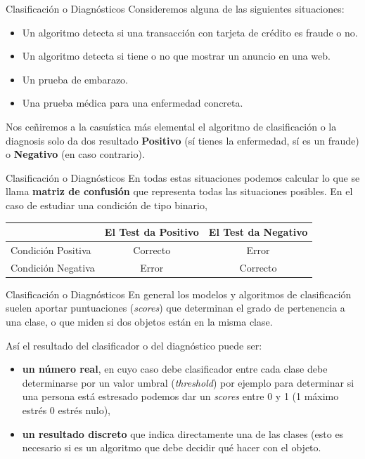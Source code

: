\documentclass[
  ignorenonframetext,
]{beamer}
\providecommand{\tightlist}{%
  \setlength{\itemsep}{0pt}\setlength{\parskip}{0pt}}
\begin{document}
\begin{frame}{Clasificación o Diagnósticos}
\protect\hypertarget{clasificaciuxf3n-o-diagnuxf3sticos}{}
Consideremos alguna de las siguientes situaciones:

\begin{itemize}
\tightlist
\item
  Un algoritmo detecta si una transacción con tarjeta de crédito es
  fraude o no.
\item
  Un algoritmo detecta si tiene o no que mostrar un anuncio en una web.
\item
  Un prueba de embarazo.
\item
  Una prueba médica para una enfermedad concreta.
\end{itemize}

Nos ceñiremos a la casuística más elemental el algoritmo de
clasificación o la diagnosis solo da dos resultado \textbf{Positivo} (sí
tienes la enfermedad, sí es un fraude) o \textbf{Negativo} (en caso
contrario).
\end{frame}

\begin{frame}{Clasificación o Diagnósticos}
\protect\hypertarget{clasificaciuxf3n-o-diagnuxf3sticos-1}{}
En todas estas situaciones podemos calcular lo que se llama
\textbf{matriz de confusión} que representa todas las situaciones
posibles. En el caso de estudiar una condición de tipo binario,

\begin{longtable}[]{@{}lcc@{}}
\toprule
& El Test da Positivo & El Test da Negativo \\
\midrule
\endhead
Condición Positiva & Correcto & Error \\
Condición Negativa & Error & Correcto \\
\bottomrule
\end{longtable}
\end{frame}

\begin{frame}{Clasificación o Diagnósticos}
\protect\hypertarget{clasificaciuxf3n-o-diagnuxf3sticos-2}{}
En general los modelos y algoritmos de clasificación suelen aportar
puntuaciones (\emph{scores}) que determinan el grado de pertenencia a
una clase, o que miden si dos objetos están en la misma clase.

Así el resultado del clasificador o del diagnóstico puede ser:

\begin{itemize}
\tightlist
\item
  \textbf{un número real}, en cuyo caso debe clasificador entre cada
  clase debe determinarse por un valor umbral (\emph{threshold}) por
  ejemplo para determinar si una persona está estresado podemos dar un
  \emph{scores} entre 0 y 1 (1 máximo estrés 0 estrés nulo),
\item
  \textbf{un resultado discreto} que indica directamente una de las
  clases (esto es necesario si es un algoritmo que debe decidir qué
  hacer con el objeto.
\end{itemize}
\end{frame}
\end{document}
